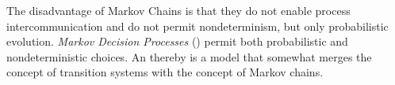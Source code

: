 \documentclass[preview]{standalone}
\begin{document}

The disadvantage of Markov Chains is that they do not enable process intercommunication and do not permit nondeterminism, but only probabilistic evolution. \emph{Markov Decision Processes} (\mdpsN) permit both probabilistic and nondeterministic choices. An \mdpN thereby is a model that somewhat merges the concept of transition systems with the concept of Markov chains. 
%
%
\end{document}
